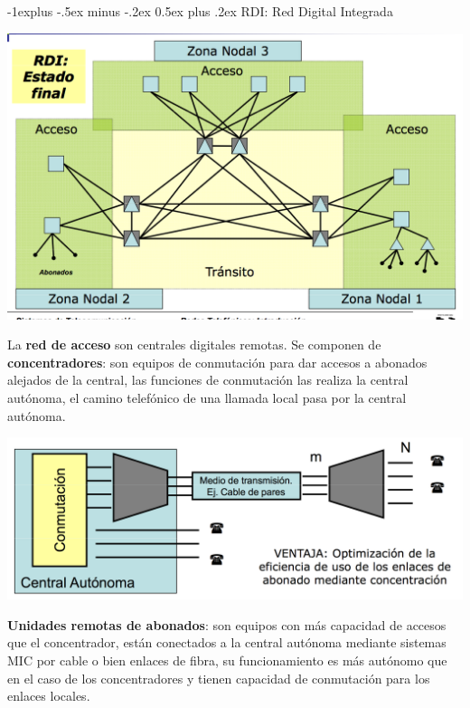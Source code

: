 \documentclass[10pt,portrait, twocolumn]{article}
\makeatletter
\renewcommand{\subsection}{\@startsection{subsection}{2}{0mm}%
                                {-1explus -.5ex minus -.2ex}%
                                {0.5ex plus .2ex}%
                                {\normalfont\normalsize\bfseries}}
\makeatother
\begin{document}
\subsection{RDI: Red Digital Integrada}

	\begin{center}
		\includegraphics[scale=0.2]{images/RDII}
	\end{center}

La \textbf{red de acceso} son centrales digitales remotas. Se componen de \textbf{concentradores}: son equipos de conmutación para dar accesos a abonados alejados de la central, las funciones de conmutación las realiza la central autónoma, el camino telefónico de una llamada local pasa por la central autónoma.

	\begin{center}
		\includegraphics[scale=0.2]{images/RedAcceso}
	\end{center}

\textbf{Unidades remotas de abonados}: son equipos con más capacidad de accesos que el concentrador, están conectados a la central autónoma mediante sistemas MIC por cable o bien enlaces de fibra, su funcionamiento es más autónomo que en el caso de los concentradores y tienen capacidad de conmutación para los enlaces locales.
\end{document}
